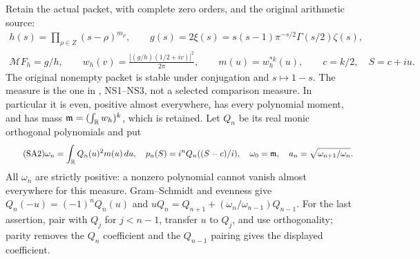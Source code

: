 \documentclass[11pt]{article}
\begin{document}
Retain the actual packet, with complete zero orders, and
the original arithmetic source:
\begin{equation}\tag{SA1}\label{sap:SA1}
\begin{gathered}
h(s)=\prod_{\rho\in Z}(s-\rho)^{m_\rho},\qquad
g(s)=2\xi(s)=s(s-1)\pi^{-s/2}\Gamma(s/2)\zeta(s),\\
\mathcal MF_h=g/h,\qquad
w_h(v)=\frac{|(g/h)(1/2+iv)|^2}{2\pi},\qquad
m(u)=w_h^{*k}(u),\qquad c=k/2,\quad S=c+iu.
\end{gathered}
\end{equation}
The original nonempty packet is stable under conjugation
and $s\mapsto1-s$. The measure is the one in \cite{sap:Native},
NS1--NS3, not a selected comparison measure. In particular
it is even, positive almost everywhere, has every polynomial
moment, and has mass
$\mathfrak m=(\int_\mathbb R w_h)^k$, which is retained.
Let $Q_n$ be its real monic orthogonal polynomials and put
\begin{equation}\tag{SA2}\label{sap:SA2}
\omega_n=\int_\mathbb R Q_n(u)^2m(u)\,du,\quad
p_n(S)=i^nQ_n((S-c)/i),\quad
\omega_0=\mathfrak m,\quad
a_n=\sqrt{\omega_{n+1}/\omega_n}.
\end{equation}
All $\omega_n$ are strictly positive: a nonzero polynomial
cannot vanish almost everywhere for this measure.
Gram--Schmidt and evenness give
$Q_n(-u)=(-1)^nQ_n(u)$ and
$uQ_n=Q_{n+1}+(\omega_n/\omega_{n-1})Q_{n-1}$.
For the last assertion, pair with $Q_j$ for $j<n-1$,
transfer $u$ to $Q_j$, and use orthogonality; parity removes
the $Q_n$ coefficient and the $Q_{n-1}$ pairing gives
the displayed coefficient.
\end{document}
